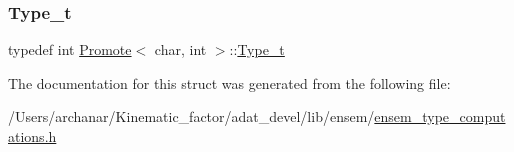 \subsubsection{\texorpdfstring{Type\_t}{Type\_t}\hspace{0.1cm}{\footnotesize\ttfamily [2/2]}}
{\footnotesize\ttfamily typedef int \mbox{\hyperlink{structPromote}{Promote}}$<$ char, int $>$\+::\mbox{\hyperlink{structPromote_3_01char_00_01int_01_4_aa4465fce51bfd64e6f93b628ecbec70f}{Type\+\_\+t}}}



The documentation for this struct was generated from the following file\+:\begin{DoxyCompactItemize}
\item 
/\+Users/archanar/\+Kinematic\+\_\+factor/adat\+\_\+devel/lib/ensem/\mbox{\hyperlink{lib_2ensem_2ensem__type__computations_8h}{ensem\+\_\+type\+\_\+computations.\+h}}\end{DoxyCompactItemize}
